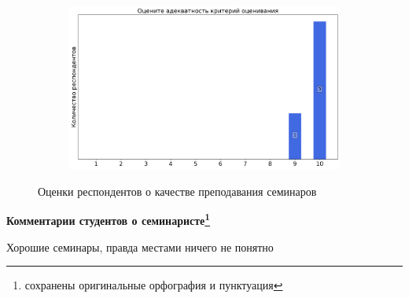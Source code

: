 \begin{figure}[H]
\begin{subfigure}[b]{0.45\textwidth}
			\end{subfigure}
			\begin{subfigure}[b]{0.45\textwidth}
				\centering
				\includegraphics[width=\textwidth]{images/2 course/Аналитическая механика/seminarists-marks-Фомичев А.В.-3.png}
			\end{subfigure}	
			\caption{Оценки респондентов о качестве преподавания семинаров}
		\end{figure}

		\textbf{Комментарии студентов о семинаристе\protect\footnote{сохранены оригинальные орфография и пунктуация}}
            \begin{commentbox} 
                Хорошие семинары, правда местами ничего не понятно 
            \end{commentbox} 
